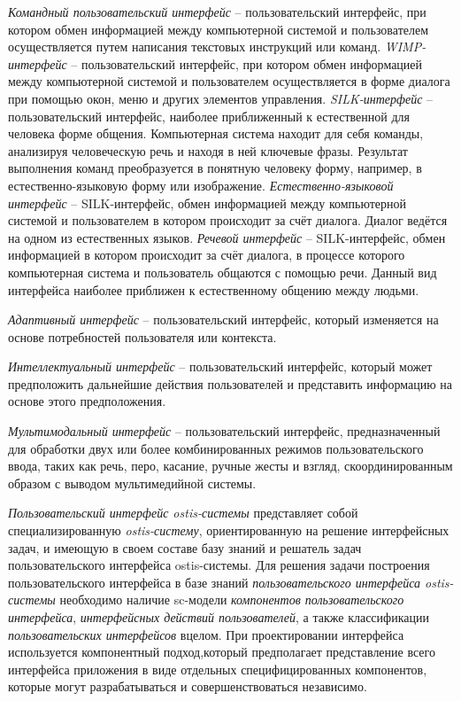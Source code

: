 \bigskip
\textit{Командный пользовательский интерфейс} -- пользовательский интерфейс, при котором обмен информацией между компьютерной системой и пользователем осуществляется путем написания текстовых инструкций или команд.
\textit{WIMP-интерфейс} -- пользовательский интерфейс, при котором обмен информацией между компьютерной системой и пользователем осуществляется в форме диалога при помощью окон, меню и других элементов управления.
\textit{SILK-интерфейс} -- пользовательский интерфейс, наиболее приближенный к естественной для человека форме общения. Компьютерная система находит для себя команды, анализируя человеческую речь и находя в ней ключевые фразы. Результат выполнения команд преобразуется в понятную человеку форму, например, в естественно-языковую форму или изображение.
\textit{Естественно-языковой интерфейс} -- SILK-интерфейс, обмен информацией между компьютерной системой и пользователем в котором происходит за счёт диалога. Диалог ведётся на одном из естественных языков.
\textit{Речевой интерфейс} -- SILK-интерфейс, обмен информацией в котором происходит за счёт диалога, в процессе которого компьютерная система и пользователь общаются с помощью речи. Данный вид интерфейса наиболее приближен к естественному общению между людьми.

\textit{Адаптивный интерфейс} -- пользовательский интерфейс, который изменяется на основе потребностей пользователя или контекста.

\textit{Интеллектуальный интерфейс} -- пользовательский интерфейс, который может предположить дальнейшие действия пользователей и представить информацию на основе этого предположения.

\textit{Мультимодальный интерфейс} -- пользовательский интерфейс, предназначенный для обработки двух или более комбинированных режимов пользовательского ввода, таких как речь, перо, касание, ручные жесты и взгляд, скоординированным образом с выводом мультимедийной системы.

\textit{Пользовательский интерфейс ostis-системы} представляет собой специализированную \textit{ostis-систему}, ориентированную на решение интерфейсных задач, и имеющую в своем составе базу знаний и решатель задач пользовательского интерфейса ostis-системы.
Для решения задачи построения пользовательского интерфейса в базе знаний \textit{пользовательского интерфейса ostis-системы} необходимо наличие sc-модели \textit{компонентов пользовательского интерфейса}, \textit{интерфейсных действий пользователей}, а также классификации \textit{пользовательских интерфейсов} вцелом. При проектировании интерфейса используется компонентный подход,который предполагает представление всего интерфейса приложения в виде отдельных специфицированных компонентов, которые могут разрабатываться и совершенствоваться независимо.

